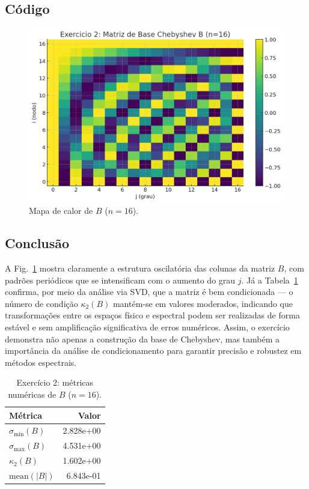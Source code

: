 \documentclass[11pt,a4paper]{article}
\begin{document}
\subsection*{Código}


\begin{figure}[h!]\centering
\includegraphics[width=0.75\linewidth]{figures/ex2_basis_heatmap.png}
\caption{Mapa de calor de $B$ ($n=16$).}
\label{fig:ex2_B}
\end{figure}

\subsection*{Conclusão}
A Fig.~\ref{fig:ex2_B} mostra claramente a estrutura oscilatória das colunas da matriz $B$, com padrões periódicos que se intensificam com o aumento do grau $j$. 
Já a Tabela~\ref{tab:ex2} confirma, por meio da análise via SVD, que a matriz é bem condicionada — o número de condição $\kappa_2(B)$ mantém-se em valores moderados, indicando que transformações entre os espaços físico e espectral podem ser realizadas de forma estável e sem amplificação significativa de erros numéricos. 
Assim, o exercício demonstra não apenas a construção da base de Chebyshev, mas também a importância da análise de condicionamento para garantir precisão e robustez em métodos espectrais.

\begin{table}[h!]\centering
\caption{Exercício 2: métricas numéricas de $B$ ($n=16$).}
\label{tab:ex2}
\begin{tabular}{l r}
\toprule
Métrica & Valor \\
\midrule
$\sigma_{\min}(B)$ & 2.828e+00 \\
$\sigma_{\max}(B)$ & 4.531e+00 \\
$\kappa_2(B)$ & 1.602e+00 \\
$\mathrm{mean}(|B|)$ & 6.843e-01 \\
\bottomrule
\end{tabular}
\end{table}
\end{document}
